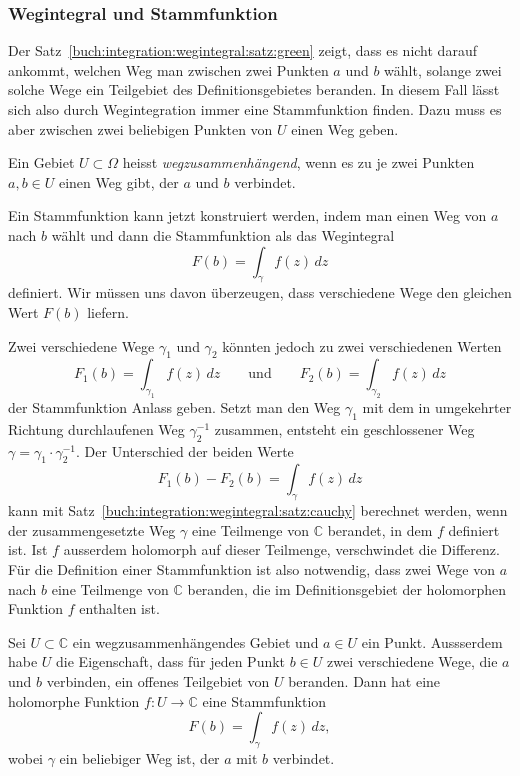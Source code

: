 %
%
\subsubsection{Wegintegral und Stammfunktion}
Der Satz~\ref{buch:integration:wegintegral:satz:green}
zeigt, dass es nicht darauf ankommt, welchen Weg man zwischen
zwei Punkten $a$ und $b$ wählt, solange zwei solche Wege ein
Teilgebiet des Definitionsgebietes beranden.
In diesem Fall lässt sich also durch Wegintegration immer eine
Stammfunktion finden.
%
Dazu muss es aber zwischen zwei beliebigen Punkten von $U$ einen
Weg geben.

\begin{definition}[wegzusammenhängend]
Ein Gebiet $U\subset\Omega$ heisst \emph{wegzusammenhängend}, wenn
%
es zu je zwei Punkten $a,b\in U$ einen Weg gibt, der $a$ und $b$
verbindet.
\end{definition}

Ein Stammfunktion kann jetzt konstruiert werden, indem man einen
Weg von $a$ nach $b$ wählt und dann die Stammfunktion als das
Wegintegral
\[
F(b)
=
\int_\gamma f(z)\,dz
\]
definiert.
Wir müssen uns davon überzeugen, dass verschiedene Wege den gleichen
Wert $F(b)$ liefern.

Zwei verschiedene Wege $\gamma_1$ und $\gamma_2$
könnten jedoch zu zwei verschiedenen Werten
\[
F_1(b)
=
\int_{\gamma_1}f(z)\,dz
\qquad\text{und}\qquad
F_2(b)
=
\int_{\gamma_2}f(z)\,dz
\]
der Stammfunktion Anlass geben.
Setzt man den Weg $\gamma_1$ mit dem in umgekehrter Richtung
durchlaufenen Weg $\gamma_2^{-1}$ zusammen, entsteht ein
geschlossener Weg $\gamma=\gamma_1\cdot\gamma_2^{-1}$.
Der Unterschied der beiden Werte
\[
F_1(b) - F_2(b)
=
\int_\gamma f(z)\,dz
\]
kann mit Satz~\ref{buch:integration:wegintegral:satz:cauchy}
berechnet werden, wenn der zusammengesetzte Weg $\gamma$ eine
Teilmenge von $\mathbb{C}$ berandet, in dem $f$ definiert ist.
Ist $f$ ausserdem holomorph auf dieser Teilmenge, verschwindet
die Differenz.
Für die Definition einer Stammfunktion ist also notwendig, dass
zwei Wege von $a$ nach $b$ eine Teilmenge von $\mathbb{C}$
beranden, die im Definitionsgebiet der holomorphen Funktion $f$
enthalten ist.

\begin{satz}[Stammfunktion]
\label{buch:integration:wegintegral:satz:stammfunktion}
%
%
Sei $U\subset\mathbb{C}$ ein wegzusammenhängendes Gebiet und $a\in U$
ein Punkt.
Aussserdem habe $U$ die Eigenschaft, dass für jeden Punkt $b\in U$
zwei verschiedene Wege, die $a$ und $b$ verbinden, ein offenes Teilgebiet
von $U$ beranden.
Dann hat eine holomorphe Funktion $f\colon U\to\mathbb{C}$ eine Stammfunktion
\[
F(b)
=
\int_\gamma f(z)\,dz,
\]
wobei $\gamma$ ein beliebiger Weg ist, der $a$ mit $b$ verbindet.
\end{satz}
